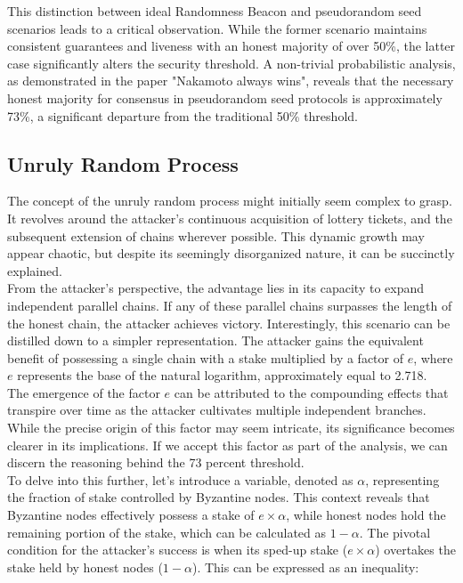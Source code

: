 This distinction between ideal Randomness Beacon and pseudorandom seed scenarios leads to a critical observation. While the former scenario maintains consistent guarantees and liveness with an honest majority of over 50\%, the latter case significantly alters the security threshold. A non-trivial probabilistic analysis, as demonstrated in the paper "Nakamoto always wins", reveals that the necessary honest majority for consensus in pseudorandom seed protocols is approximately 73\%, a significant departure from the traditional 50\% threshold.
\subsection{Unruly Random Process}
The concept of the unruly random process might initially seem complex to grasp. It revolves around the attacker's continuous acquisition of lottery tickets, and the subsequent extension of chains wherever possible. This dynamic growth may appear chaotic, but despite its seemingly disorganized nature, it can be succinctly explained.\\
From the attacker's perspective, the advantage lies in its capacity to expand independent parallel chains. If any of these parallel chains surpasses the length of the honest chain, the attacker achieves victory. Interestingly, this scenario can be distilled down to a simpler representation. The attacker gains the equivalent benefit of possessing a single chain with a stake multiplied by a factor of \(e\), where \(e\) represents the base of the natural logarithm, approximately equal to 2.718.\\
The emergence of the factor \(e\) can be attributed to the compounding effects that transpire over time as the attacker cultivates multiple independent branches. While the precise origin of this factor may seem intricate, its significance becomes clearer in its implications. If we accept this factor as part of the analysis, we can discern the reasoning behind the 73 percent threshold.\\
To delve into this further, let's introduce a variable, denoted as \(\alpha\), representing the fraction of stake controlled by Byzantine nodes. This context reveals that Byzantine nodes effectively possess a stake of \(e \times \alpha\), while honest nodes hold the remaining portion of the stake, which can be calculated as \(1 - \alpha\). The pivotal condition for the attacker's success is when its sped-up stake (\(e \times \alpha\)) overtakes the stake held by honest nodes (\(1 - \alpha\)). This can be expressed as an inequality:

